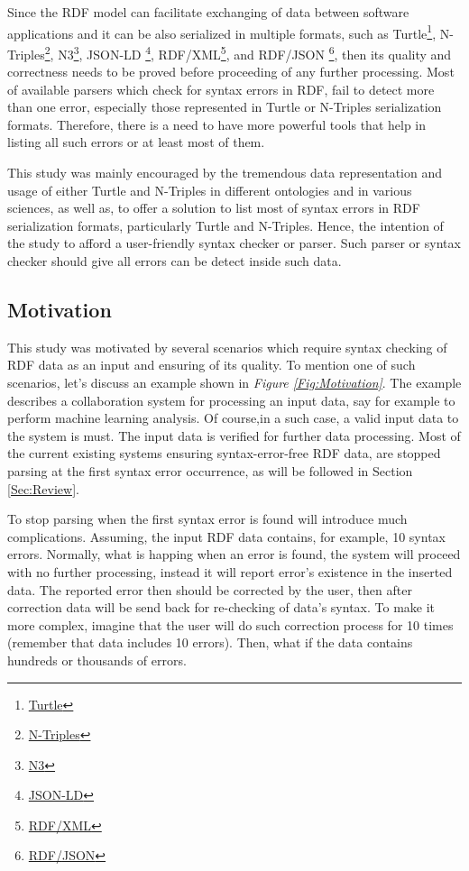 Since the RDF model can facilitate  exchanging of data between software applications and it can be also serialized in multiple formats, such as Turtle\footnote{\href{https://www.w3.org/TR/turtle/}{Turtle}}, N-Triples\footnote{\href{https://www.w3.org/TR/n-triples/}{N-Triples}}, N3\footnote{\href{https://www.w3.org/TeamSubmission/n3/}{N3}}, JSON-LD	\footnote{\href{https://www.w3.org/2018/jsonld-cg-reports/json-ld/}{JSON-LD}}, RDF{/}XML\footnote{\href{https://www.w3.org/TR/rdf-syntax-grammar/}{RDF{/}XML}}, and RDF{/}JSON	\footnote{\href{https://dvcs.w3.org/hg/rdf/raw-file/default/rdf-json/index.html}{RDF{/}JSON}}, then its  quality and correctness needs to be proved before proceeding of any further processing. Most of available  parsers which check for syntax errors in RDF, fail to detect more than one error, especially those represented in Turtle or N-Triples serialization formats. Therefore, there is a need to have more powerful tools that help in listing all such errors or at least most of them.%


This study was mainly  encouraged by the tremendous data representation and usage of either Turtle and N-Triples in different ontologies and in various sciences, as well as, to offer a solution to list most of syntax errors in RDF serialization formats, particularly Turtle and N-Triples. Hence, the intention of the study to afford a user-friendly syntax checker or parser. Such parser or syntax checker should give all errors can be detect inside such data.


\subsection{Motivation}

This study was motivated by several scenarios which require syntax checking of RDF data as an input and ensuring of its quality. To mention one of such scenarios, let's discuss an example shown in {\it Figure \ref{Fig:Motivation}}. The example describes a collaboration system for processing an input data, say for example to perform machine learning analysis. Of course,in a such case, a valid input data to the system is must. The input data is verified for further data processing. Most of the current existing systems  ensuring syntax-error-free RDF data, are stopped parsing at the first syntax error occurrence, as will be followed in Section \ref{Sec:Review}.
	\par
	To stop parsing when the first syntax error is found will introduce much complications. Assuming, the input RDF data contains, for example, 10 syntax errors. Normally, what is happing when an error is found, the system will proceed with no further processing, instead it will report error's existence in the inserted data. The reported error then should be corrected by the user, then after correction data will be send back for re-checking of data's syntax. To make it more complex, imagine that the user will do such correction process for 10 times (remember that data includes 10 errors). Then, what if the data contains hundreds or thousands of errors. 

